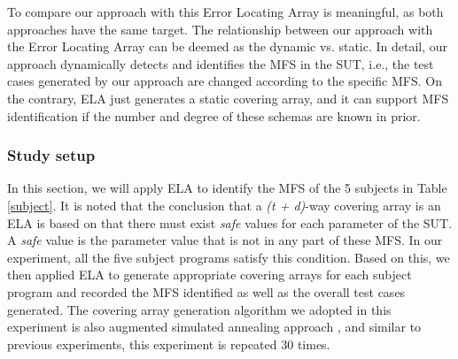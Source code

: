 \documentclass[journal,12pt,onecolumn,draftclsnofoot,]{IEEEtran}
\begin{document}
To compare our approach with this Error Locating Array is meaningful, as both approaches have the same target. The relationship between our approach with the Error Locating Array can be deemed as the dynamic vs. static. In detail, our approach dynamically detects and identifies the MFS in the SUT, i.e., the test cases generated by our approach are changed according to the specific MFS. On the contrary, ELA just generates a static covering array, and it can support MFS identification if the number and degree of these schemas are known in prior.



\subsubsection{Study setup}
In this section, we will  apply ELA to identify the MFS of the 5 subjects in Table \ref{subject}. It is noted that the conclusion that a \emph{(t + d)}-way covering array is an ELA
is based on that there must exist \emph{safe} values for each parameter of the SUT. A \emph{safe} value is the parameter value that is not in any part of these MFS. In our experiment, all the five subject programs satisfy this condition. Based on this, we then applied ELA to generate appropriate covering arrays for each subject program and recorded the MFS identified as well as the overall test cases generated. The covering array generation algorithm we adopted in this experiment is also augmented simulated annealing approach \cite{cohen2003augmenting,cohen2008constructing2}, and similar to previous experiments, this experiment is repeated 30 times.


\end{document}
